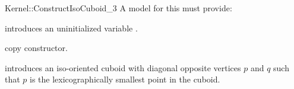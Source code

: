 \begin{ccRefFunctionObjectConcept}{Kernel::ConstructIsoCuboid_3}
A model for this must provide:



\ccHidden {}
             {introduces an uninitialized variable .}

\ccHidden {}
            {copy constructor.}

            {introduces an iso-oriented cuboid  with diagonal
             opposite vertices $p$ and $q$ such that $p$ is the
             lexicographically smallest point in the cuboid.}

\ccSeeAlso
{}  \\

\end{ccRefFunctionObjectConcept}

